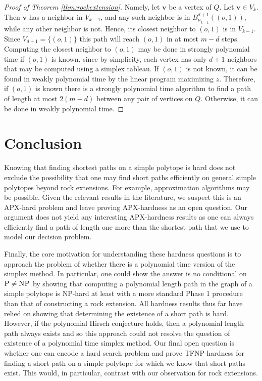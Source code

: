 \documentclass[centering,11pt,reqno]{amsart}
\theoremstyle{definition}
\newcommand{\NP}{\textsc{NP}}
\newcommand{\PP}{\textsc{P}}
\begin{document}
\begin{proof}[Proof of Theorem \ref{thm:rockextension}]
Namely, let $\mathbf{v}$ be a vertex of $Q$. Let $\mathbf{v} \in V_{k}$. Then $\mathbf{v}$ has a neighbor in $V_{k-1}$, and any such neighbor is in $B_{\mu_{k-1}}^{d+1}((o,1))$, while any other neighbor is not. Hence, its closest neighbor to $(o,1)$ is in $V_{k-1}$. Since $V_{d+1} = \{(o,1)\}$ this path will reach $(o,1)$ in at most $m-d$ steps. Computing the closest neighbor to $(o,1)$ may be done in strongly polynomial time if $(o,1)$ is known, since by simplicity, each vertex has only $d+1$ neighbors that may be computed using a simplex tableau. If $(o,1)$ is not known, it can be found in weakly polynomial time by the linear program maximizing $z$. Therefore, if $(o,1)$ is known there is a strongly polynomial time algorithm to find a path of length at most $2(m-d)$ between any pair of vertices on $Q$. Otherwise, it can be done in weakly polynomial time.

\end{proof}


\section{Conclusion}
\label{sec:conclusion}

Knowing that finding shortest paths on a simple polytope is hard does not exclude the possibility that one may find short paths efficiently on general simple polytopes beyond rock extensions. For example, approximation algorithms may be possible. Given the relevant results in the literature, we suspect this is an APX-hard problem and leave proving APX-hardness as an open question. Our argument does not yield any interesting APX-hardness results as one can always efficiently find a path of length one more than the shortest path that we use to model our decision problem. 


Finally, the core motivation for understanding these hardness questions is to approach the problem of whether there is a polynomial time version of the simplex method. In particular, one could show the answer is no conditional on $\PP \neq \NP$ by showing that computing a polynomial length path in the graph of a simple polytope is \NP-hard at least with a more standard Phase 1 procedure than that of constructing a rock extension. All hardness results thus far have relied on showing that determining the existence of a short path is hard. However, if the polynomial Hirsch conjecture holds, then a polynomial length path always exists and so this approach could not resolve the question of existence of a polynomial time simplex method. Our final open question is whether one can encode a hard search problem and prove TFNP-hardness for finding a short path on a simple polytope for which we know that short paths exist. This would, in particular, contrast with our observation for rock extensions.
\end{document}
